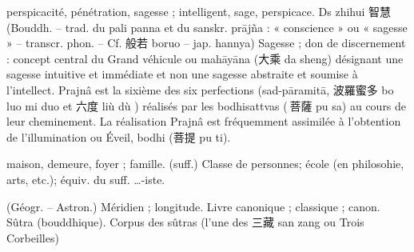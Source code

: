 \begin{Def}[hui 慧 ]
    perspicacité, pénétration, sagesse ; intelligent, sage, perspicace. Ds zhihui 智慧 (Bouddh. – trad. du pali panna et du sanskr. prājña : « conscience » ou « sagesse » – transcr. phon. – Cf. 般若 boruo – jap. hannya) Sagesse ; don de discernement : concept central du Grand véhicule ou mahāyāna (大乘 da sheng) désignant une sagesse intuitive et immédiate et non une sagesse abstraite et soumise à l’intellect. Prajnâ est la sixième des six perfections (sad-pāramitā, 波羅蜜多 bo luo mi duo et 六度 liù dù ) réalisés par les bodhisattvas ( 菩薩 pu sa) au cours de leur cheminement. La réalisation Prajnâ est fréquemment assimilée à l’obtention de l’illumination ou Éveil, bodhi (菩提 pu ti).
\end{Def}
\begin{Def}[jia 家]
    maison, demeure, foyer ; famille. (suff.) Classe de personnes; école (en philosohie, arts, etc.); équiv. du suff. …-iste. 
\end{Def}
\begin{Def}[jing 經]
    (Géogr. – Astron.) Méridien ; longitude.	Livre canonique ; classique ; canon. Sûtra (bouddhique). Corpus des sûtras (l’une des 三藏 san zang ou Trois Corbeilles)
\end{Def}

